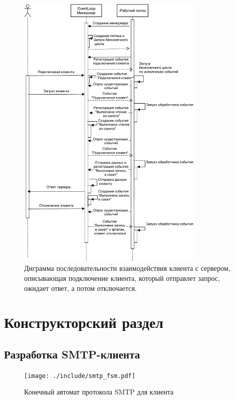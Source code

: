 \documentclass[a4paper,12pt]{report}
\begin{document}
	\begin{figure}[H]
		\centering
		\includegraphics[width=0.8\textwidth]{./resource/SequenceDiagram_EventLoop.pdf}
		\caption{ Диграмма последовательности взаимодействия клиента с сервером, описывающая подключение клиента, который отправлет запрос, ожидает ответ, а потом отключается.} 
		\label{fig:EventLoopSequence}
	\end{figure}


 	\chapter{Конструкторский раздел}

 	\section{Разработка SMTP-клиента}
    
    	\begin{figure}[h]
		\centering
		\texttt{[image: ./include/smtp\_fsm.pdf]}
		\caption{Конечный автомат протокола SMTP для клиента}
		\label{fig:smtp_fsm}
	\end{figure}
     
\end{document}
